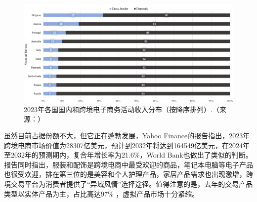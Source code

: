 \documentclass[12pt]{ctexart}
\begin{document}
\begin{figure}[htbp!]
    \centering
    \includegraphics[width=1\textwidth]{Images/1_00.png}
    \caption{2023年各国国内和跨境电子商务活动收入分布（按降序排列）.（来源：\cite{6}）}
    \label{fl}
\end{figure}

虽然目前占据份额不大，但它正在蓬勃发展，Yahoo Finance的报告\cite{7}指出，2023年跨境电商市场价值为28307亿美元，预计到2032年将达到164549亿美元，在2024年至2032年的预测期内，复合年增长率为21.6\%，World Bank也做出了类似的判断。报告同时指出，服装和配饰是跨境电商中最受欢迎的商品，笔记本电脑等电子产品也很受欢迎，排在第三位的是美容和个人护理产品，家居产品需求也出现激增，跨境交易平台为消费者提供了“异域风情”选择途径。值得注意的是，去年的交易产品类型以实体产品为主，占比高达97\% \cite{6}，虚拟产品市场十分紧缩。
\end{document}
